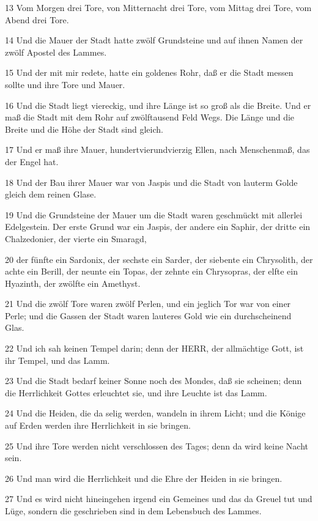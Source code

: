 \par 13 Vom Morgen drei Tore, von Mitternacht drei Tore, vom Mittag drei Tore, vom Abend drei Tore.
\par 14 Und die Mauer der Stadt hatte zwölf Grundsteine und auf ihnen Namen der zwölf Apostel des Lammes.
\par 15 Und der mit mir redete, hatte ein goldenes Rohr, daß er die Stadt messen sollte und ihre Tore und Mauer.
\par 16 Und die Stadt liegt viereckig, und ihre Länge ist so groß als die Breite. Und er maß die Stadt mit dem Rohr auf zwölftausend Feld Wegs. Die Länge und die Breite und die Höhe der Stadt sind gleich.
\par 17 Und er maß ihre Mauer, hundertvierundvierzig Ellen, nach Menschenmaß, das der Engel hat.
\par 18 Und der Bau ihrer Mauer war von Jaspis und die Stadt von lauterm Golde gleich dem reinen Glase.
\par 19 Und die Grundsteine der Mauer um die Stadt waren geschmückt mit allerlei Edelgestein. Der erste Grund war ein Jaspis, der andere ein Saphir, der dritte ein Chalzedonier, der vierte ein Smaragd,
\par 20 der fünfte ein Sardonix, der sechste ein Sarder, der siebente ein Chrysolith, der achte ein Berill, der neunte ein Topas, der zehnte ein Chrysopras, der elfte ein Hyazinth, der zwölfte ein Amethyst.
\par 21 Und die zwölf Tore waren zwölf Perlen, und ein jeglich Tor war von einer Perle; und die Gassen der Stadt waren lauteres Gold wie ein durchscheinend Glas.
\par 22 Und ich sah keinen Tempel darin; denn der HERR, der allmächtige Gott, ist ihr Tempel, und das Lamm.
\par 23 Und die Stadt bedarf keiner Sonne noch des Mondes, daß sie scheinen; denn die Herrlichkeit Gottes erleuchtet sie, und ihre Leuchte ist das Lamm.
\par 24 Und die Heiden, die da selig werden, wandeln in ihrem Licht; und die Könige auf Erden werden ihre Herrlichkeit in sie bringen.
\par 25 Und ihre Tore werden nicht verschlossen des Tages; denn da wird keine Nacht sein.
\par 26 Und man wird die Herrlichkeit und die Ehre der Heiden in sie bringen.
\par 27 Und es wird nicht hineingehen irgend ein Gemeines und das da Greuel tut und Lüge, sondern die geschrieben sind in dem Lebensbuch des Lammes.

